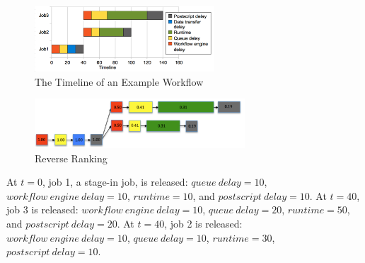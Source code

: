 \begin{figure}[h!]
	\centering
    \includegraphics[width=0.6\textwidth]{figures/model/overhead_timeline.pdf}
    \caption{The Timeline of an Example Workflow}
    \label{fig:model_overhead_timeline}
\end{figure}
\begin{figure}[h!]
	\centering
    \includegraphics[width=0.7\textwidth]{figures/model/rr.pdf}
    \caption{Reverse Ranking}
    \label{fig:model_rr}
\end{figure}
At $t=0$, job 1, a stage-in job, is released: $queue~delay = 10$, $workflow~engine~delay = 10$, $runtime = 10$, and $postscript~delay = 10$.
At $t=40$, job 3 is released: $workflow~engine~delay = 10$, $queue~delay = 20$, $runtime = 50$, and $postscript~delay = 20$.
At $t=40$, job 2 is released: $workflow~engine~delay = 10$, $queue~delay = 10$, $runtime = 30$, $postscript~delay = 10$. 

 



